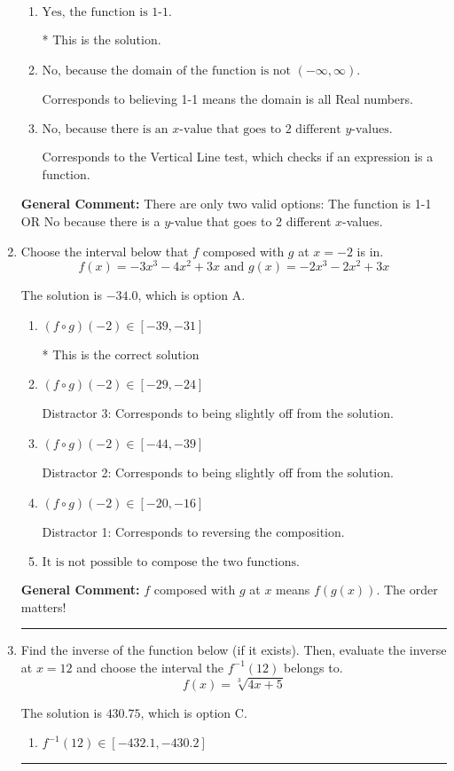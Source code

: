 \documentclass{extbook}[14pt]
\newcommand{\litem}[1]{\item #1

\rule{\textwidth}{0.4pt}}
\begin{document}
\begin{enumerate}
{\begin{enumerate}[label=\Alph*.]
Corresponds to the Horizontal Line test, which this function passes.
\item \( \text{Yes, the function is 1-1.} \)

* This is the solution.
\item \( \text{No, because the domain of the function is not $(-\infty, \infty)$.} \)

Corresponds to believing 1-1 means the domain is all Real numbers.
\item \( \text{No, because there is an $x$-value that goes to 2 different $y$-values.} \)

Corresponds to the Vertical Line test, which checks if an expression is a function.
\end{enumerate}

\textbf{General Comment:} There are only two valid options: The function is 1-1 OR No because there is a $y$-value that goes to 2 different $x$-values.
}
\litem{
Choose the interval below that $f$ composed with $g$ at $x=-2$ is in.
\[ f(x) = -3x^{3} -4 x^{2} +3 x \text{ and } g(x) = -2x^{3} -2 x^{2} +3 x \]

The solution is \( -34.0 \), which is option A.\begin{enumerate}[label=\Alph*.]
\item \( (f \circ g)(-2) \in [-39, -31] \)

* This is the correct solution
\item \( (f \circ g)(-2) \in [-29, -24] \)

 Distractor 3: Corresponds to being slightly off from the solution.
\item \( (f \circ g)(-2) \in [-44, -39] \)

 Distractor 2: Corresponds to being slightly off from the solution.
\item \( (f \circ g)(-2) \in [-20, -16] \)

 Distractor 1: Corresponds to reversing the composition.
\item \( \text{It is not possible to compose the two functions.} \)


\end{enumerate}

\textbf{General Comment:} $f$ composed with $g$ at $x$ means $f(g(x))$. The order matters!
}
\litem{
Find the inverse of the function below (if it exists). Then, evaluate the inverse at $x = 12$ and choose the interval the $f^{-1}(12)$ belongs to.
\[ f(x) = \sqrt[3]{4 x + 5} \]

The solution is \( 430.75 \), which is option C.\begin{enumerate}[label=\Alph*.]
\item \( f^{-1}(12) \in [-432.1, -430.2] \)


\end{enumerate}}
\end{enumerate}
\end{document}

